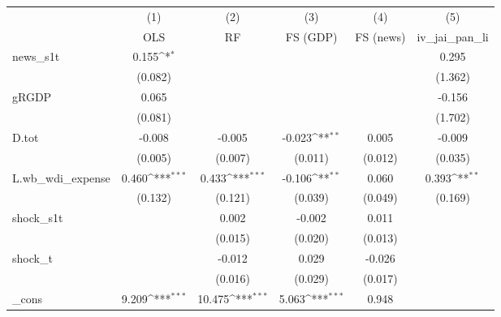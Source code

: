 {
\def\sym#1{\ifmmode^{#1}\else\(^{#1}\)\fi}
\begin{tabular}{l*{5}{c}}
\toprule
            &\multicolumn{1}{c}{(1)}&\multicolumn{1}{c}{(2)}&\multicolumn{1}{c}{(3)}&\multicolumn{1}{c}{(4)}&\multicolumn{1}{c}{(5)}\\
            &\multicolumn{1}{c}{OLS}&\multicolumn{1}{c}{RF}&\multicolumn{1}{c}{FS (GDP)}&\multicolumn{1}{c}{FS (news)}&\multicolumn{1}{c}{iv\_jai\_pan\_li}\\
\midrule
news\_s1t    &       0.155\sym{*}  &                     &                     &                     &       0.295         \\
            &     (0.082)         &                     &                     &                     &     (1.362)         \\
\addlinespace
gRGDP       &       0.065         &                     &                     &                     &      -0.156         \\
            &     (0.081)         &                     &                     &                     &     (1.702)         \\
\addlinespace
D.tot       &      -0.008         &      -0.005         &      -0.023\sym{**} &       0.005         &      -0.009         \\
            &     (0.005)         &     (0.007)         &     (0.011)         &     (0.012)         &     (0.035)         \\
\addlinespace
L.wb\_wdi\_expense&       0.460\sym{***}&       0.433\sym{***}&      -0.106\sym{**} &       0.060         &       0.393\sym{**} \\
            &     (0.132)         &     (0.121)         &     (0.039)         &     (0.049)         &     (0.169)         \\
\addlinespace
shock\_s1t   &                     &       0.002         &      -0.002         &       0.011         &                     \\
            &                     &     (0.015)         &     (0.020)         &     (0.013)         &                     \\
\addlinespace
shock\_t     &                     &      -0.012         &       0.029         &      -0.026         &                     \\
            &                     &     (0.016)         &     (0.029)         &     (0.017)         &                     \\
\addlinespace
\_cons      &       9.209\sym{***}&      10.475\sym{***}&       5.063\sym{***}&       0.948         &                     \\

\end{tabular}}
